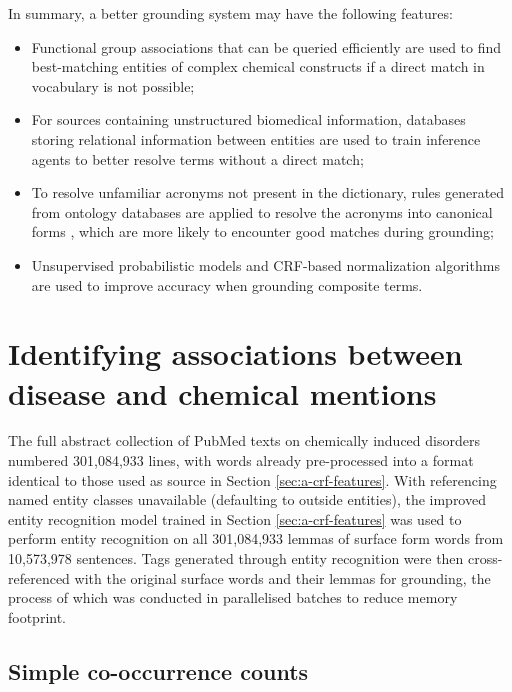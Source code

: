 \documentclass[10pt, oneside]{article}
\begin{document}
In summary, a better grounding system may have the following features:
\begin{itemize}
	\item Functional group associations that can be queried efficiently \cite{tsuruoka2008facta} are used to find best-matching entities of complex chemical constructs if a direct match in vocabulary is not possible;
	\item For sources containing unstructured biomedical information, databases storing relational information \cite{kim2005biocontrasts} between entities are used to train inference agents \cite{shin2015incremental} to better resolve terms without a direct match;
	\item To resolve unfamiliar acronyms not present in the dictionary, rules generated from ontology databases are applied to resolve the acronyms into canonical forms \cite{naderi2011organismtagger}, which are more likely to encounter good matches during grounding;
	\item Unsupervised probabilistic models \cite{pecina2010lexical} and CRF-based normalization algorithms \cite{lee2016audis} are used to improve accuracy when grounding composite terms.
\end{itemize}

\section{Identifying associations between disease and chemical mentions}

The full abstract collection of PubMed texts on chemically induced disorders numbered 301,084,933 lines, with words already pre-processed into a format identical to those used as source in Section \ref{sec:a-crf-features}. With referencing named entity classes unavailable (defaulting to outside entities), the improved entity recognition model trained in Section \ref{sec:a-crf-features} was used to perform entity recognition on all 301,084,933 lemmas of surface form words from 10,573,978 sentences. Tags generated through entity recognition were then cross-referenced with the original surface words and their lemmas for grounding, the process of which was conducted in parallelised batches to reduce memory footprint. 

\subsection{Simple co-occurrence counts} \label{subsec:simple-co}
\end{document}
